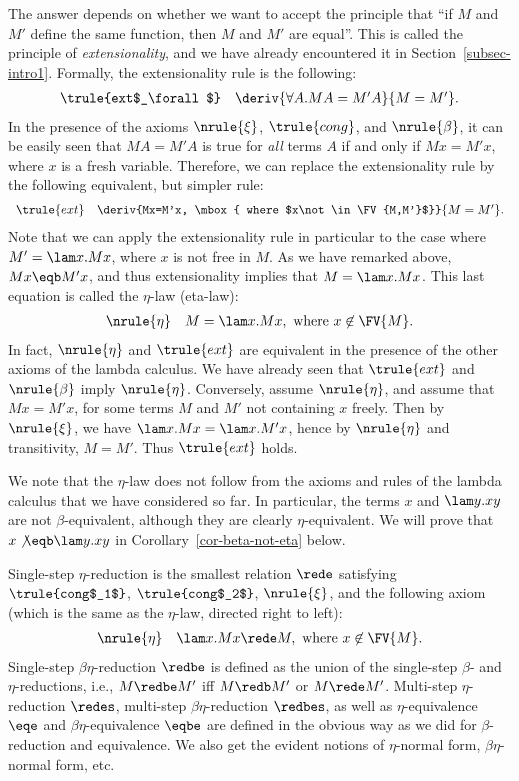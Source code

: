\documentclass[12pt]{article}
\begin{document}
The answer depends on whether we want to accept the principle that
``if $M$ and $M'$ define the same function, then $M$ and $M'$ are
equal''. This is called the principle of {\em extensionality}, and we
have already encountered it in Section~\ref{subsec-intro1}. Formally, the
extensionality rule is the following:
\[ \begin{array}{lc}
  \trule{ext$_\forall$} & \deriv{\forall A.MA=M'A}{M=M'}.
\end{array}
\]
In the presence of the axioms $\nrule{\xi}$, $\trule{cong}$, and
$\nrule{\beta}$, it can be easily seen that $MA=M'A$ is true for {\em
  all} terms $A$ if and only if $Mx=M'x$, where $x$ is a fresh
variable. Therefore, we can replace the extensionality rule by the
following equivalent, but simpler rule:
\[ \begin{array}{lc}
  \trule{ext} & \deriv{Mx=M'x, \mbox{ where $x\not\in\FV{M,M'}$}}{M=M'}.
\end{array}
\]
Note that we can apply the extensionality rule in particular to the
case where $M'=\lam x.Mx$, where $x$ is not free in $M$. As we have
remarked above, $Mx\eqb M'x$, and thus extensionality implies that
$M=\lam x.Mx$. This last equation is called the $\eta$-law (eta-law):
\[ \begin{array}{lc}
  \nrule{\eta} & M=\lam x.Mx, \mbox{ where $x\not\in\FV{M}$}.
\end{array}
\]
In fact, $\nrule{\eta}$ and $\trule{ext}$ are equivalent in the
presence of the other axioms of the lambda calculus. We have already
seen that $\trule{ext}$ and $\nrule{\beta}$ imply $\nrule{\eta}$.
Conversely, assume $\nrule{\eta}$, and assume that $Mx=M'x$, for some
terms $M$ and $M'$ not containing $x$ freely.  Then by $\nrule{\xi}$,
we have $\lam x.Mx=\lam x.M'x$, hence by $\nrule{\eta}$ and
transitivity, $M=M'$. Thus $\trule{ext}$ holds.

We note that the $\eta$-law does not follow from the axioms and rules
of the lambda calculus that we have considered so far. In particular,
the terms $x$ and $\lam y.xy$ are not $\beta$-equivalent, although
they are clearly $\eta$-equivalent. We will prove that $x\not\eqb \lam
y.xy$ in Corollary~\ref{cor-beta-not-eta} below.

Single-step $\eta$-reduction is the smallest relation $\rede$
satisfying $\trule{cong$_1$}$, $\trule{cong$_2$}$, $\nrule{\xi}$, and
the following axiom (which is the same as the $\eta$-law, directed
right to left):
\[ \begin{array}{lc}\label{page-def-eta}
  \nrule{\eta} & \lam x.Mx\rede M, \mbox{ where $x\not\in\FV{M}$}.
\end{array}
\]
Single-step $\beta\eta$-reduction $\redbe$ is defined as the union of
the single-step $\beta$- and $\eta$-reductions, i.e., $M\redbe M'$ iff
$M\redb M'$ or $M\rede M'$. Multi-step $\eta$-reduction $\redes$,
multi-step $\beta\eta$-reduction $\redbes$, as well as
$\eta$-equivalence $\eqe$ and $\beta\eta$-equivalence $\eqbe$ are
defined in the obvious way as we did for $\beta$-reduction and
equivalence. We also get the evident notions of $\eta$-normal form,
$\beta\eta$-normal form, etc.
\end{document}
